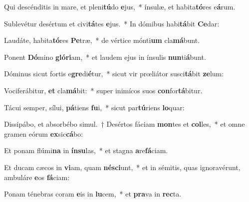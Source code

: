 \item Qui descénditis in mare, et pleni\textbf{tú}do \textbf{e}jus,~* ínsulæ, et habita\textbf{tó}res e\textbf{á}rum.
\item Sublevétur desértum et civi\textbf{tá}tes \textbf{e}jus.~* In dómibus habi\textbf{tá}bit \textbf{Ce}dar:
\item Laudáte, habita\textbf{tó}res \textbf{Pe}træ,~* de vértice mónti\textbf{um} cla\textbf{má}bunt.
\item Ponent \textbf{Dó}mino \textbf{gló}\textbf{ri}am,~* et laudem ejus in ínsulis \textbf{nun}ti\textbf{á}bunt.
\item Dóminus sicut fortis e\textbf{gre}di\textbf{é}tur,~* sicut vir prœliátor susci\textbf{tá}bit \textbf{ze}lum:
\item Vociferábitur, \textbf{et} cla\textbf{má}bit:~* super inimícos suos \textbf{con}for\textbf{tá}bitur.
\item Tácui semper, sílui, \textbf{pá}tiens \textbf{fu}i,~* sicut par\textbf{tú}riens \textbf{lo}quar:
\item Dissipábo, et absorbébo simul.~† Desértos fáciam \textbf{mon}tes et \textbf{col}les,~* et omne gramen eórum \textbf{ex}sic\textbf{cá}bo:
\item Et ponam flúmi\textbf{na} in \textbf{ín}\textbf{su}las,~* et stagna \textbf{a}re\textbf{fá}ciam.
\item Et ducam cæcos in \textbf{vi}am, quam \textbf{né}\textbf{sci}unt,~* et in sémitis, quas ignoravérunt, ambuláre \textbf{e}os \textbf{fá}ciam:
\item Ponam ténebras coram \textbf{e}is in \textbf{lu}cem,~* et \textbf{pra}va in \textbf{rec}ta.
